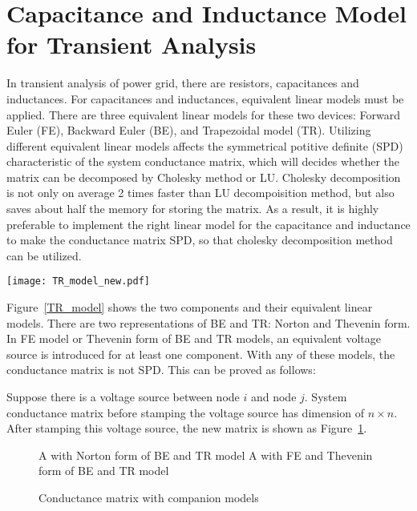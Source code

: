 \section{Capacitance and Inductance Model for Transient Analysis}
In transient analysis of power grid, there are resistors, capacitances and inductances. For capacitances and inductances, equivalent linear models must be applied. There are three equivalent linear models for these two devices: Forward Euler (FE), Backward Euler (BE), and Trapezoidal model (TR). Utilizing different equivalent linear models affects the symmetrical potitive definite (SPD) characteristic of the system conductance matrix, which will decides whether the matrix can be decomposed by Cholesky method or LU. Cholesky decomposition is not only on average 2 times faster than LU decompoisition method, but also saves about half the memory for storing the matrix. As a result, it is
highly preferable to implement the right linear model for the capacitance and inductance to make the conductance matrix SPD, so that cholesky decomposition method can be utilized. 
\begin{figure*}[htbp]
  \centering
  \texttt{[image: TR\_model\_new.pdf]}
  \caption{Companion models for capacitor and inductor.}
  \label{TR_model}
\end{figure*}

Figure~\ref{TR_model} shows the two components and their equivalent linear models. There are two representations of BE and TR: Norton and Thevenin form. In FE model or Thevenin form of BE and TR models, an equivalent voltage source is introduced for at least one component. 
With any of these models, the conductance matrix is not SPD. This can be proved as follows: 


Suppose there is a voltage source between node $i$ and node $j$. System conductance matrix before stamping the voltage source has dimension of $n\times n$. After stamping this voltage source, the new matrix is shown as Figure~\ref{SPD_matrix_modify}.

\begin{figure}[htbp]
 \centering
{}
 \caption{Conductance matrix with companion models}
  A with Norton form of BE and TR model
  A with FE and Thevenin form of BE and TR model
 \label{SPD_matrix_modify}
\end{figure}

